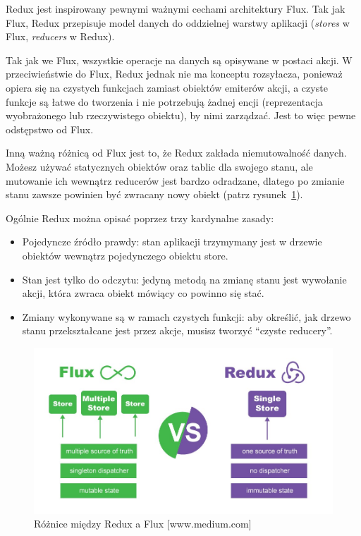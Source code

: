 Redux jest inspirowany pewnymi ważnymi cechami architektury Flux.
Tak jak Flux, Redux przepisuje model danych do oddzielnej warstwy aplikacji
(\textit{stores} w Flux, \textit{reducers} w Redux).

Tak jak we Flux, wszystkie operacje na danych są opisywane w postaci akcji.
W przeciwieństwie do Flux, Redux jednak nie ma konceptu rozsyłacza,
ponieważ opiera się na czystych funkcjach zamiast obiektów emiterów akcji,
a czyste funkcje są łatwe do tworzenia i nie potrzebują żadnej encji
(reprezentacja wyobrażonego lub rzeczywistego obiektu), by nimi zarządzać.
Jest to więc pewne odstępstwo od Flux.
~\cite{www_nafrontendzie}

Inną ważną różnicą od Flux jest to, że Redux zakłada niemutowalność danych.
Możesz używać statycznych obiektów oraz tablic dla swojego stanu,
ale mutowanie ich wewnątrz reducerów jest bardzo odradzane,
dlatego po zmianie stanu zawsze powinien być zwracany nowy obiekt (patrz rysunek~\ref{rys:reduxFlux}).

Ogólnie Redux można opisać poprzez trzy kardynalne zasady:
\begin{itemize}
	\item Pojedyncze źródło prawdy: stan aplikacji trzymymany jest
	w drzewie obiektów wewnątrz pojedynczego obiektu store.
	\item Stan jest tylko do odczytu: jedyną metodą na zmianę stanu jest wywołanie akcji,
	która zwraca obiekt mówiący co powinno się stać.
	\item Zmiany wykonywane są w ramach czystych funkcji: aby określić, jak drzewo stanu
	przekształcane jest przez akcje, musisz tworzyć ``czyste reducery''.
\end{itemize}

\begin{figure}
	\centering\includegraphics[width=\textwidth]{img/reduxFlux.jpeg}
	\caption{Różnice między Redux a Flux [www.medium.com]}\label{rys:reduxFlux}%
\end{figure}

